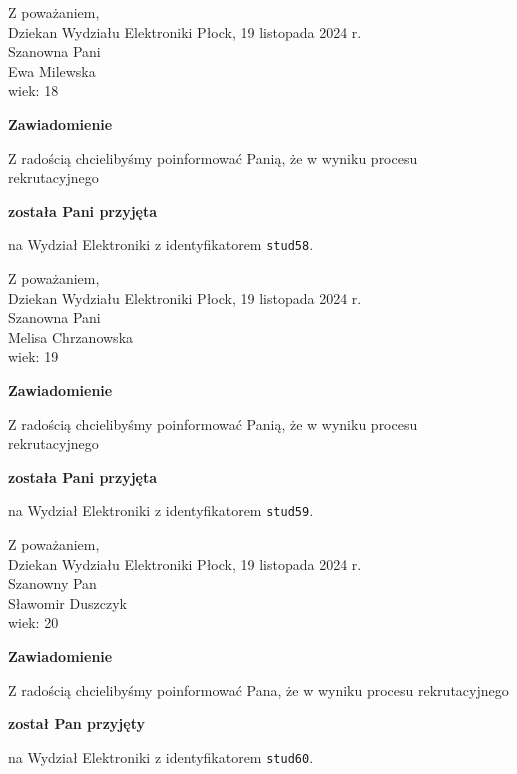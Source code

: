 \documentclass[12pt,a4paper]{article}
\begin{document}
\noindent
Z poważaniem,\\
Dziekan
Wydziału Elektroniki
\newpage
\hfill Płock, 19 listopada 2024 r.\\ 
\noindent 
Szanowna Pani \\
Ewa Milewska \\
wiek: 18

\bigskip

\begin{center}
{\Large\textbf{Zawiadomienie}}
\end{center}
\bigskip
Z radością chcielibyśmy poinformować Panią, że w wyniku procesu rekrutacyjnego
\begin{center}
\textsf{\textbf{została Pani przyjęta}} 
\end{center}
na Wydział Elektroniki z identyfikatorem \verb|stud58|.
\vspace{2cm}

\noindent
Z poważaniem,\\
Dziekan
Wydziału Elektroniki
\newpage
\hfill Płock, 19 listopada 2024 r.\\ 
\noindent 
Szanowna Pani \\
Melisa Chrzanowska \\
wiek: 19

\bigskip

\begin{center}
{\Large\textbf{Zawiadomienie}}
\end{center}
\bigskip
Z radością chcielibyśmy poinformować Panią, że w wyniku procesu rekrutacyjnego
\begin{center}
\textsf{\textbf{została Pani przyjęta}} 
\end{center}
na Wydział Elektroniki z identyfikatorem \verb|stud59|.
\vspace{2cm}

\noindent
Z poważaniem,\\
Dziekan
Wydziału Elektroniki
\newpage
\hfill Płock, 19 listopada 2024 r.\\ 
\noindent 
Szanowny Pan \\
Sławomir Duszczyk \\
wiek: 20

\bigskip

\begin{center}
{\Large\textbf{Zawiadomienie}}
\end{center}
\bigskip
Z radością chcielibyśmy poinformować Pana, że w wyniku procesu rekrutacyjnego
\begin{center}
\textsf{\textbf{został Pan przyjęty}} 
\end{center}
na Wydział Elektroniki z identyfikatorem \verb|stud60|.
\vspace{2cm}
\end{document}
